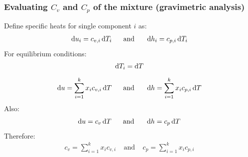 \documentclass[class=report, crop=false, 12pt,a4paper]{standalone}
\begin{document}
\subsubsection{Evaluating $C_v$ and $C_p$ of the mixture (gravimetric analysis)}
Define specific heats for single component $i$ as:
\begin{gather}
  \dif u_i = c_{v,i}\dif T_i \ \ \ \ \ \text{and} \ \ \ \ \ \dif h_i = c_{p,i}\dif T_i
\end{gather}
For equilibrium conditions:
\begin{gather}
  \dif T_i = \dif T \\[5pt]
  \dif u = \sum_{i=1}^{k}x_i c_{v,i}\dif T \ \ \ \ \ \text{and} \ \ \ \ \ \dif h = \sum_{i=1}^{k}x_i c_{p,i}\dif T
\end{gather}
Also:
\begin{gather}
  \dif u = c_v\dif T \ \ \ \ \ \text{and} \ \ \ \ \ \dif h = c_p\dif T
\end{gather}
Therefore:
\begin{gather}
  c_v = \sum_{i=1}^{k}x_i c_{v,i} \ \ \ \ \ \text{and} \ \ \ \ \ c_p = \sum_{i=1}^{k}x_i c_{p,i}
\end{gather}
\end{document}
